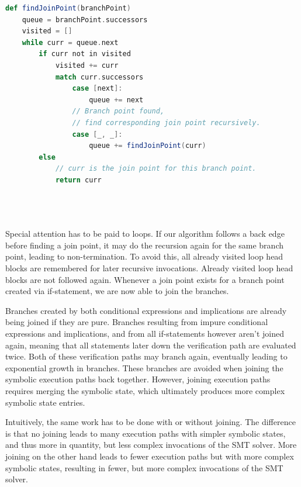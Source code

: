 \documentclass[11pt]{article}
\begin{document}
    \begin{lstlisting}[language=Scala, caption={The join point finding algorithm without support for loops.}, label={lst:join-point-algorithm}]
def findJoinPoint(branchPoint)
    queue = branchPoint.successors
    visited = []
    while curr = queue.next
        if curr not in visited
            visited += curr
            match curr.successors
                case [next]:
                    queue += next
                // Branch point found,
                // find corresponding join point recursively.
                case [_, _]:
                    queue += findJoinPoint(curr)
        else
            // curr is the join point for this branch point.
            return curr

    
        
    \end{lstlisting}

    Special attention has to be paid to loops. If our algorithm follows a back edge before finding a join point,
    it may do the recursion again for the same branch point, leading to non-termination.
    To avoid this, all already visited loop head blocks
    are remembered for later recursive invocations. Already visited loop head blocks are not followed again.
    Whenever a join point exists for a branch point created via if-statement, we are now able
    to join the branches.

    Branches created by both conditional expressions and implications are already being joined if they are pure.
    Branches resulting from impure conditional expressions and implications,
    and from all if-statements however aren't joined again, meaning that
    all statements later down the verification path are evaluated twice. Both of these
    verification paths may branch again, eventually leading to exponential growth in branches.
    These branches are avoided when joining the symbolic execution paths back together.
    However, joining execution paths requires merging the symbolic state, which
    ultimately produces more complex symbolic state entries.

    Intuitively, the same work has to be done with or without joining. The difference is that
    no joining leads
    to many execution paths with simpler symbolic states, and thus more in quantity, but less complex
    invocations of the SMT solver. More joining on the other hand leads to
    fewer execution paths but with more complex symbolic states, resulting in fewer,
    but more complex invocations of the SMT solver.
\end{document}
